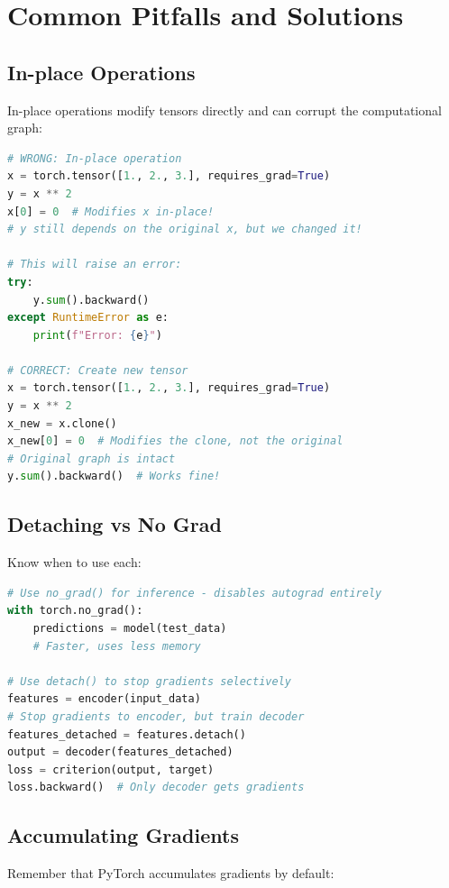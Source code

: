\documentclass{article}
\begin{document}
\section{Common Pitfalls and Solutions}

\subsection{In-place Operations}

In-place operations modify tensors directly and can corrupt the computational graph:

\begin{lstlisting}[language=Python]
# WRONG: In-place operation
x = torch.tensor([1., 2., 3.], requires_grad=True)
y = x ** 2
x[0] = 0  # Modifies x in-place!
# y still depends on the original x, but we changed it!

# This will raise an error:
try:
    y.sum().backward()
except RuntimeError as e:
    print(f"Error: {e}")

# CORRECT: Create new tensor
x = torch.tensor([1., 2., 3.], requires_grad=True)
y = x ** 2
x_new = x.clone()
x_new[0] = 0  # Modifies the clone, not the original
# Original graph is intact
y.sum().backward()  # Works fine!
\end{lstlisting}

\subsection{Detaching vs No Grad}

Know when to use each:

\begin{lstlisting}[language=Python]
# Use no_grad() for inference - disables autograd entirely
with torch.no_grad():
    predictions = model(test_data)
    # Faster, uses less memory

# Use detach() to stop gradients selectively
features = encoder(input_data)
# Stop gradients to encoder, but train decoder
features_detached = features.detach()
output = decoder(features_detached)
loss = criterion(output, target)
loss.backward()  # Only decoder gets gradients
\end{lstlisting}

\subsection{Accumulating Gradients}

Remember that PyTorch accumulates gradients by default:
\end{document}
